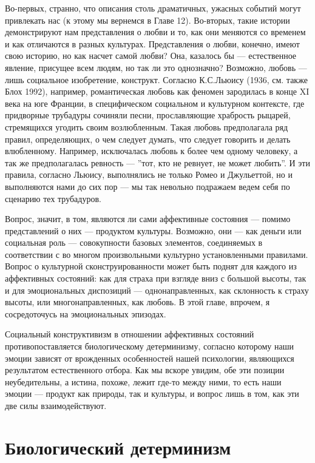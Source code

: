 \documentclass[11pt]{book}
\begin{document}
Во-первых, странно, что описания столь драматичных, ужасных событий могут привлекать нас (к этому мы вернемся в Главе 12). Во-вторых, такие истории демонстрируют нам представления о любви и то, как они меняются со временем и как отличаются в разных культурах. Представления о любви, конечно, имеют свою историю, но как насчет самой любви? Она, казалось бы --- естественное явление, присущее всем людям, но так ли это однозначно? Возможно, любовь --- лишь социальное изобретение, конструкт. Согласно К.С.Льюису (1936, см. также Блох 1992), например, романтическая любовь как феномен зародилась в конце XI века на юге Франции, в специфическом социальном и культурном контексте, где придворные трубадуры сочиняли песни, прославляющие храбрость рыцарей, стремящихся угодить своим возлюбленным. Такая любовь предполагала ряд правил, определяющих, о чем следует думать, что следует говорить и делать влюбленному. Например, исключалась любовь к более чем одному человеку, а так же предполагалась ревность --- ''тот, кто не ревнует, не может любить''. И эти правила, согласно Льюису, выполнялись не только Ромео и Джульеттой, но и выполняются нами до сих пор --- мы так невольно подражаем ведем себя по сценарию тех трубадуров.

Вопрос, значит, в том, являются ли сами аффективные состояния --- помимо представлений о них --- продуктом культуры. Возможно, они --- как деньги или социальная роль --- совокупности базовых элементов, соединяемых в соответствии с во многом произвольными культурно установленными правилами. Вопрос о культурной сконструированности может быть поднят для каждого из аффективных состояний: как для страха при взгляде вниз с большой высоты, так и для эмоциональных диспозиций --- однонаправленных, как склонность к страху высоты, или многонаправленных, как любовь. В этой главе, впрочем, я сосредоточусь на эмоциональных эпизодах.

Социальный конструктивизм в отношении аффективных состояний противопоставляется биологическому детерминизму, согласно которому наши эмоции зависят от врожденных особенностей нашей психологии, являющихся результатом естественного отбора. Как мы вскоре увидим, обе эти позиции неубедительны, а истина, похоже, лежит где-то между ними, то есть наши эмоции --- продукт как природы, так и культуры, и вопрос лишь в том, как эти две силы взаимодействуют.

\section{Биологический детерминизм}
\end{document}
